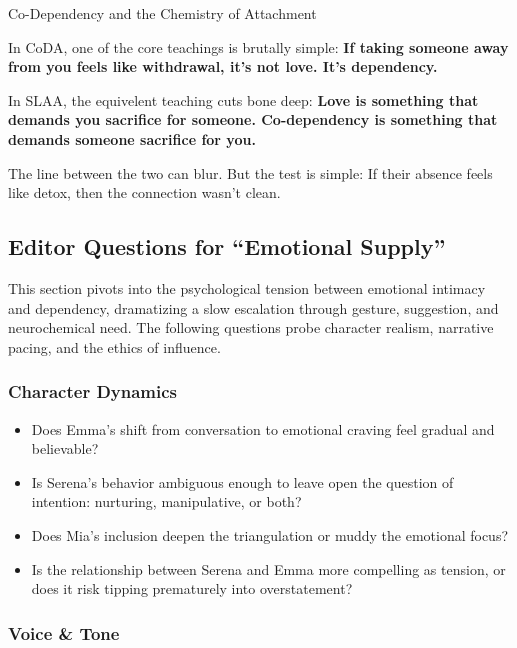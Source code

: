 \begin{PhilosophicalSidebar}{Co-Dependency and the Chemistry of Attachment}
    \medskip
    
    In CoDA, one of the core teachings is brutally simple:  
    \textbf{If taking someone away from you feels like withdrawal, it's not love. It's dependency.}

    \medskip
   
    In SLAA, the equivelent teaching cuts bone deep:
    \textbf{Love is something that demands you sacrifice for someone. 
    Co-dependency is something that demands someone sacrifice for you.}
    
    \medskip
    
    The line between the two can blur.  
    But the test is simple:  
    If their absence feels like detox, then the connection wasn’t clean.

    \medskip

    
\end{PhilosophicalSidebar}


\subsection*{Editor Questions for ``Emotional Supply''}

This section pivots into the psychological tension between emotional intimacy and dependency, dramatizing a slow escalation through gesture, suggestion, and neurochemical need. The following questions probe character realism, narrative pacing, and the ethics of influence.

\subsubsection*{Character Dynamics}

\begin{itemize}
  \item Does Emma’s shift from conversation to emotional craving feel gradual and believable?
  \item Is Serena’s behavior ambiguous enough to leave open the question of intention: nurturing, manipulative, or both?
  \item Does Mia’s inclusion deepen the triangulation or muddy the emotional focus?
  \item Is the relationship between Serena and Emma more compelling as tension, or does it risk tipping prematurely into overstatement?
\end{itemize}

\subsubsection*{Voice \& Tone}

